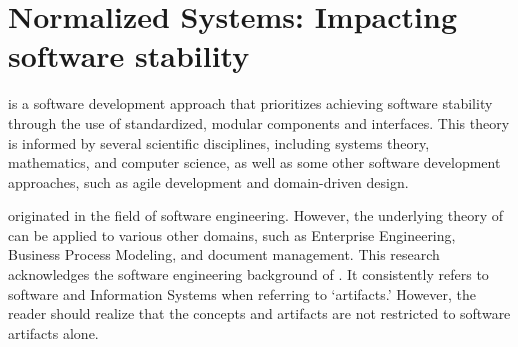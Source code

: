 \section{Normalized Systems: Impacting software stability} \label{sec_ns_theory}

\ns is a software development approach that prioritizes achieving software stability
through the use of standardized, modular components and interfaces. This theory is
informed by several scientific disciplines, including systems theory, mathematics, and
computer science, as well as some other software development approaches, such as agile
development and domain-driven design.

\ns originated in the field of software engineering. However, the underlying theory
of \ns can be applied to various other domains, such as Enterprise Engineering,
Business Process Modeling, and document management. This research acknowledges the
software engineering background of \ns. It consistently refers to software and
Information Systems when referring to \enquote*{artifacts.} However, the reader should
realize that the concepts and artifacts are not restricted to software artifacts alone.












